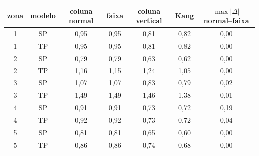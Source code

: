 \begin{tabular}{cc|cccc|c}
\toprule
zona & modelo & coluna normal & faixa & coluna vertical & Kang & $\max|\Delta|$ normal--faixa\\
\midrule
1 & SP & 0{,}95 & 0{,}95 & 0{,}81 & 0{,}82 & 0{,}00 \\
1 & TP & 0{,}95 & 0{,}95 & 0{,}81 & 0{,}82 & 0{,}00 \\
2 & SP & 0{,}79 & 0{,}79 & 0{,}63 & 0{,}62 & 0{,}00 \\
2 & TP & 1{,}16 & 1{,}15 & 1{,}24 & 1{,}05 & 0{,}00 \\
3 & SP & 1{,}07 & 1{,}07 & 0{,}83 & 0{,}79 & 0{,}02 \\
3 & TP & 1{,}49 & 1{,}49 & 1{,}46 & 1{,}38 & 0{,}01 \\
4 & SP & 0{,}91 & 0{,}91 & 0{,}73 & 0{,}72 & 0{,}19 \\
4 & TP & 0{,}92 & 0{,}92 & 0{,}73 & 0{,}72 & 0{,}04 \\
5 & SP & 0{,}81 & 0{,}81 & 0{,}65 & 0{,}60 & 0{,}00 \\
5 & TP & 0{,}86 & 0{,}86 & 0{,}74 & 0{,}68 & 0{,}00 \\
\bottomrule
\end{tabular}
